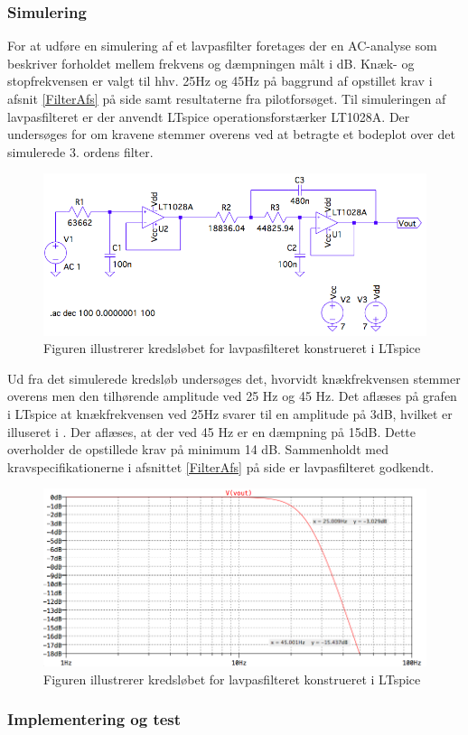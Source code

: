 \subsubsection{Simulering}
For at udføre en simulering af et lavpasfilter foretages der en AC-analyse som beskriver forholdet mellem frekvens og dæmpningen målt i dB. Knæk- og stopfrekvensen er valgt til hhv. 25Hz og 45Hz på baggrund af opstillet krav i afsnit \ref{FilterAfs} på side \pageref{FilterAfs} samt resultaterne fra pilotforsøget. Til simuleringen af lavpasfilteret er der anvendt LTspice operationsforstærker LT1028A. Der undersøges for om kravene stemmer overens ved at betragte et bodeplot over det simulerede 3. ordens filter.

\begin{figure}[H]
	\centering
	\includegraphics[scale=0.4]{figures/cProblemloesning/Lavpasfilter_LTspice.PNG}
	\caption{Figuren illustrerer kredsløbet for lavpasfilteret konstrueret i LTspice}
	\label{fig:lavpasfilter_LTspice}
\end{figure}

Ud fra det simulerede kredsløb undersøges det, hvorvidt knækfrekvensen stemmer overens men den tilhørende amplitude ved 25 Hz og 45 Hz. Det aflæses på grafen i LTspice at knækfrekvensen ved 25Hz svarer til en amplitude på 3dB, hvilket er illuseret i . Der aflæses, at der ved 45 Hz er en dæmpning på 15dB. Dette overholder de opstillede krav på minimum 14 dB. Sammenholdt med kravspecifikationerne i afsnittet \ref{FilterAfs} på side \pageref{FilterAfs} er lavpasfilteret godkendt.

\begin{figure}[H]
	\centering
	\includegraphics[scale=0.4]{figures/cProblemloesning/Lavpasfiltergraf_LTspice1.PNG}
	\caption{Figuren illustrerer kredsløbet for lavpasfilteret konstrueret i LTspice}
	\label{fig:lavpasfilter_LTspice}
\end{figure}

\subsubsection{Implementering og test}
